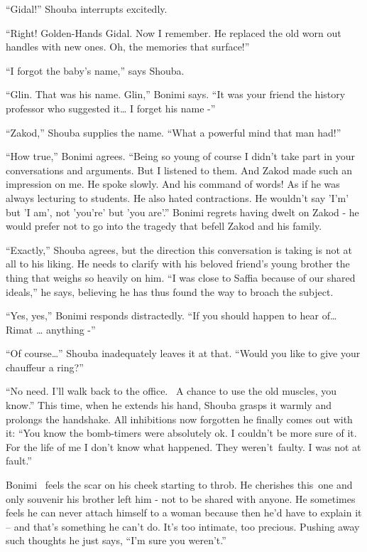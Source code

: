 \documentclass[twoside,11pt]{book}
\begin{document}
``Gidal!'' Shouba interrupts excitedly.

``Right! Golden-Hands Gidal. Now I remember. He replaced the old worn out handles with new ones. Oh, the
memories that surface!''

``I forgot the baby's name,'' says Shouba.

``Glin. That was his name. Glin,'' Bonimi says. ``It was your friend the history
professor who suggested it{\dots} I forget his name -''

``Zakod,'' Shouba supplies the name. ``What a powerful mind that man
had!''

``How true,'' Bonimi agrees. ``Being so young of course I didn't take part in
your conversations and arguments. But I listened to them. And Zakod made such an impression on me. He spoke slowly. And
his command of words! As if he was always lecturing to students. He also hated contractions. He wouldn't say 'I'm' but
'I am', not 'you're' but 'you are'.'' Bonimi regrets having dwelt on Zakod - he would prefer not to go
into the tragedy that befell Zakod and his family.

``Exactly,'' Shouba agrees, but the direction this conversation is taking is not at all to his
liking. He needs to clarify with his beloved friend's young brother the thing that weighs so heavily on him.
``I was close to Saffia because of our shared ideals,'' he says, believing he has thus found
the way to broach the subject.

``Yes, yes,'' Bonimi responds distractedly. ``If you should happen to hear
of{\dots} Rimat {\dots} anything -''

``Of course{{\dots}}'' Shouba inadequately leaves it
at that. ``Would you like to give your chauffeur a ring?''

``No need. I'll walk back to the office. \ A chance to use the old muscles, you know.'' This
time, when he extends his hand, Shouba grasps it warmly and prolongs the handshake. All inhibitions now forgotten he
finally comes out with it: ``You know the bomb-timers were absolutely ok. I couldn't be more sure of it.
For the life of me I don't know what happened. They weren't~faulty. I was not at fault.''

Bonimi~ feels the scar on his cheek starting to throb. He cherishes this~one and only souvenir his brother left him -
not to be shared with anyone. He sometimes feels he can never attach himself to a woman because then he'd have to
explain it -- and that's something he can't do. It's too intimate, too precious. Pushing away such thoughts he just
says, ``I'm sure you weren't.''
\end{document}
